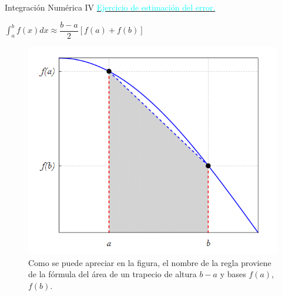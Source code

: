 \begin{frame}{Integración Numérica IV}
\label{CuadraturaTeoremaValorMedio}
\hyperlink{EjercicioCuadraturaError}{\textcolor{cyan}{Ejercicio de estimación del error.}}
\begin{Def}
\centering $\displaystyle \int_a^b f(x)dx\approx \dfrac{b-a}{2}[f(a)+f(b)]$
\end{Def}
\begin{figure}[H]
\centering
\includegraphics[scale=0.6]{Imagen24}
\caption{Como se puede apreciar en la figura, el nombre de la regla proviene de la fórmula del área de un trapecio de altura $b-a$ y bases $f(a)$, $f(b)$.}
\end{figure}
\end{frame}
